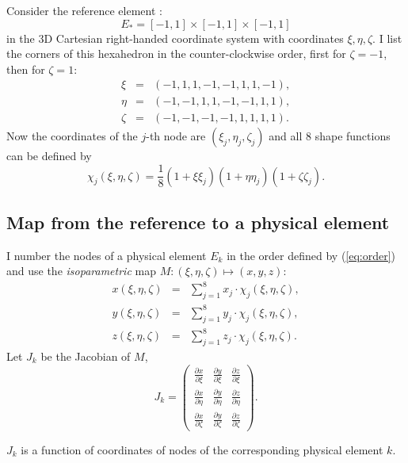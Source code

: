 \documentclass{article}
\begin{document}
Consider the reference element \cite[page 2.126]{Kardestuncer1987}:
\begin{equation}
  E_{\ast} = [ - 1, 1] \times [ - 1, 1] \times [ - 1, 1] \label{eq:reference}
\end{equation}
in the 3D Cartesian right-handed coordinate system with coordinates $\xi, \eta, \zeta$. I list the corners of this hexahedron in the
counter-clockwise order, first for $\zeta = - 1$, then for $\zeta = 1$:
\begin{eqnarray}
  \xi & = & (- 1, 1, 1, - 1, - 1, 1, 1, - 1), \nonumber\\
  \eta & = & (- 1, - 1, 1, 1, - 1, - 1, 1, 1),  \label{eq:order}\\
  \zeta & = & (- 1, - 1, - 1, - 1, 1, 1, 1, 1) . \nonumber
\end{eqnarray}
Now the coordinates of the $j$-th node are $(\xi_j, \eta_j, \zeta_j)$ and all
$8$ shape functions can be defined by
\begin{equation}
  \chi_j (\xi, \eta, \zeta) = \frac{1}{8} (1 + \xi \xi_j) (1 + \eta \eta_j)
  (1 + \zeta \zeta_j) . \label{eq:elementbasis}
\end{equation}

\subsection{Map from the reference to a physical element}

I number the nodes of a physical element $E_k$ in the order defined by
(\ref{eq:order}) and use the \emph{isoparametric} map $M : (\xi, \eta,
\zeta) \mapsto (x, y, z)$:
\begin{eqnarray}
  x (\xi, \eta, \zeta) & = & \sum_{j = 1}^8 x_j \cdot \chi_j (\xi, \eta,
  \zeta), \nonumber\\
  y (\xi, \eta, \zeta) & = & \sum_{j = 1}^8 y_j \cdot \chi_j (\xi, \eta,
  \zeta),  \label{eq:map}\\
  z (\xi, \eta, \zeta) & = & \sum_{j = 1}^8 z_j \cdot \chi_j (\xi, \eta,
  \zeta) . \nonumber
\end{eqnarray}
Let $J_k$ be the Jacobian of $M$,
\begin{equation}
  J_k = \left(\begin{array}{ccc}
    \frac{\partial x}{\partial \xi} & \frac{\partial y}{\partial \xi} &
    \frac{\partial z}{\partial \xi}\\
    \frac{\partial x}{\partial \eta} & \frac{\partial y}{\partial \eta} &
    \frac{\partial z}{\partial \eta}\\
    \frac{\partial x}{\partial \zeta} & \frac{\partial y}{\partial \zeta} &
    \frac{\partial z}{\partial \zeta}
  \end{array}\right) . \label{eq:jacobian}
\end{equation}
\begin{note}
  $J_k$ is a function of coordinates of nodes of the corresponding physical
  element $k$.
\end{note}
\end{document}
